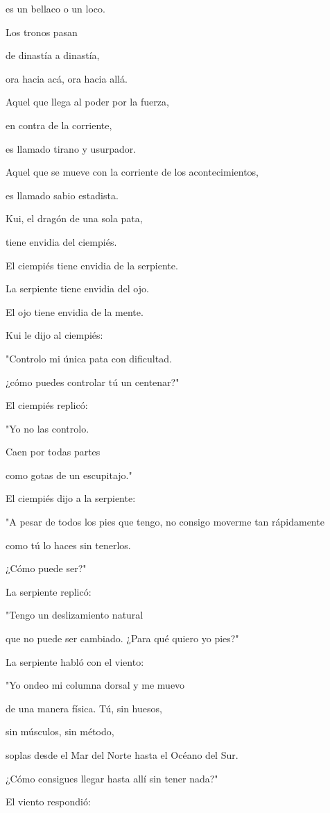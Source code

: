 es un bellaco o un loco.

Los tronos pasan

de dinastía a dinastía,

ora hacia acá, ora hacia allá.

Aquel que llega al poder por la fuerza,

en contra de la corriente,

es llamado tirano y usurpador.

Aquel que se mueve con la corriente de los acontecimientos,

es llamado sabio estadista.

Kui, el dragón de una sola pata,

tiene envidia del ciempiés.

El ciempiés tiene envidia de la serpiente.

La serpiente tiene envidia del ojo.

El ojo tiene envidia de la mente.

Kui le dijo al ciempiés:

"Controlo mi única pata con dificultad.

¿cómo puedes controlar tú un centenar?"

El ciempiés replicó:

"Yo no las controlo.

Caen por todas partes

como gotas de un escupitajo."

El ciempiés dijo a la serpiente:

"A pesar de todos los pies que tengo, no consigo moverme tan rápidamente

como tú lo haces sin tenerlos.

¿Cómo puede ser?"

La serpiente replicó:

"Tengo un deslizamiento natural

que no puede ser cambiado. ¿Para qué quiero yo pies?"

La serpiente habló con el viento:

"Yo ondeo mi columna dorsal y me muevo

de una manera física. Tú, sin huesos,

sin músculos, sin método,

soplas desde el Mar del Norte hasta el Océano del Sur.

¿Cómo consigues llegar hasta allí sin tener nada?"

El viento respondió:

